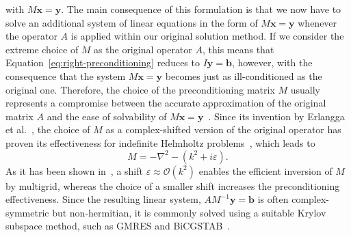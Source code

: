 with $M \bm{x} = \bm{y}$. 
The main consequence of this formulation is that we now have to solve an additional system of linear equations in the form of $M \bm{x} = \bm{y}$ whenever the operator $A$ is applied within our original solution method.
If we consider the extreme choice of $M$ as the original operator $A$, this means that Equation~\eqref{eq:right-preconditioning} reduces to $I \bm{y} = \bm{b}$, however, with the consequence that the system $M \bm{x} = \bm{y}$ becomes just as ill-conditioned as the original one.
Therefore, the choice of the preconditioning matrix $M$ usually represents a compromise between the accurate approximation of the original matrix $A$ and the ease of solvability of $M \bm{x} = \bm{y}$~\cite{benzi2002preconditioning}.
Since its invention by Erlangga et al.~\cite{erlangga2004preconditioner}, the choice of $M$ as a complex-shifted version of the original operator has proven its effectiveness for indefinite Helmholtz problems~\cite{erlangga2008advances,cocquet2017shift,umetami2009multigrid,cools2013analysis}, which leads to
\begin{equation*}
	M = -\nabla ^{2} - (k^{2} + i \varepsilon).
\end{equation*}
As it has been shown in~\cite{cocquet2017shift}, a shift $\varepsilon \approx \mathcal{O}(k^2)$ enables the efficient inversion of $M$ by multigrid, whereas the choice of a smaller shift increases the preconditioning effectiveness.
Since the resulting linear system, $A M^{-1} \bm{y} = \bm{b}$ is often complex-symmetric but non-hermitian, it is commonly solved using a suitable Krylov subspace method, such as GMRES and BiCGSTAB~\cite{saad2003iterative}.
